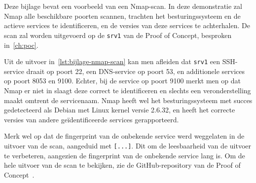 
\chapter{}%
\label{ch:bijlage_nmap}

Deze bijlage bevat een voorbeeld van een Nmap-scan.
In deze demonstratie zal Nmap alle beschikbare poorten scannen, trachten het besturingssysteem en de actieve services te identificeren, en de versies van deze services te achterhalen.
De scan zal worden uitgevoerd op de \texttt{srv1} van de Proof of Concept, besproken in~\ref{ch:poc}.

Uit de uitvoer in~\ref{lst:bijlage-nmap-scan} kan men afleiden dat \texttt{srv1} een SSH-service draait op poort 22, een DNS-service op poort 53, en additionele services op poort 8053 en 9100.
Echter, bij de service op poort 9100 merkt men op dat Nmap er niet in slaagt deze correct te identificeren en slechts een veronderstelling maakt omtrent de servicenaam.
Nmap heeft wel het besturingssysteem met succes gedetecteerd als Debian met Linux kernel versie 2.6.32, en heeft het correcte versies van andere ge\"identificeerde services gerapporteerd.

Merk wel op dat de fingerprint van de onbekende service werd weggelaten in de uitvoer van de scan, aangeduid met \texttt{[...]}.
Dit om de leesbaarheid van de uitvoer te verbeteren, aangezien de fingerprint van de onbekende service lang is.
Om de hele uitvoer van de scan te bekijken, zie de GitHub-repository van de Proof of Concept~\autocite{github-poc}.

